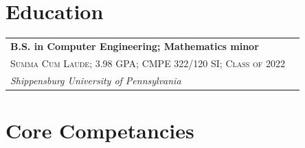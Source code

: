 \documentclass[
	10pt, %
]{FreemanCV}
\begin{document}
\medskip %





\begin{paracol}{2}

\section{Education} 


\begin{supertabular}{l l} %

	
	\textbf{B.S. in Computer Engineering; Mathematics minor}\\ %
	\small\textsc{Summa Cum Laude; 3.98 GPA; CMPE 322/120 SI; Class of 2022}\\ %
	\textit{Shippensburg University of Pennsylvania}\\ %
	

\end{supertabular}

\switchcolumn

\section{Core Competancies}


\end{paracol}
\end{document}
